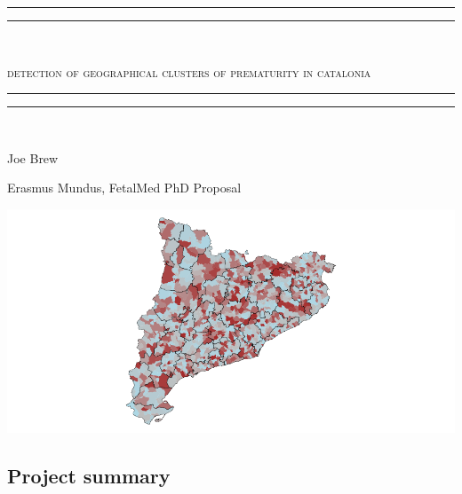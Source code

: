 \documentclass{article}
\begin{document}





\begin{center}

\rule{\textwidth}{1.6pt}\vspace*{-\baselineskip}\vspace*{2pt} %
\rule{\textwidth}{0.4pt}\\[\baselineskip] %


\begin{LARGE}
\scshape{detection of geographical clusters of prematurity in catalonia}
\end{LARGE}

\rule{\textwidth}{0.4pt}\vspace*{-\baselineskip}\vspace{3.2pt} %
\rule{\textwidth}{1.6pt}\\[\baselineskip] %

\vspace{10mm}

\begin{Large}
Joe Brew
\end{Large}
\vspace{3mm}

\begin{large}
Erasmus Mundus, FetalMed PhD Proposal 
\end{large}

\vspace{20mm}
\includegraphics{protocol-001}

\vspace{20mm}


\subsection*{Project summary}

\end{center}
\end{document}
